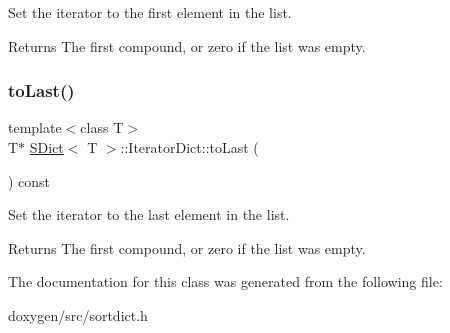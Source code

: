 Set the iterator to the first element in the list. \begin{DoxyReturn}{Returns}
The first compound, or zero if the list was empty. 
\end{DoxyReturn}
\mbox{\label{class_s_dict_1_1_iterator_dict_aae597075deb2c8fd6032b1145f9cefb0}} 
\subsubsection{\texorpdfstring{toLast()}{toLast()}}
{\footnotesize\ttfamily template$<$class T$>$ \\
T$\ast$ \mbox{\hyperlink{class_s_dict}{S\+Dict}}$<$ T $>$\+::Iterator\+Dict\+::to\+Last (\begin{DoxyParamCaption}{ }\end{DoxyParamCaption}) const\hspace{0.3cm}{\ttfamily [inline]}}

Set the iterator to the last element in the list. \begin{DoxyReturn}{Returns}
The first compound, or zero if the list was empty. 
\end{DoxyReturn}


The documentation for this class was generated from the following file\+:\begin{DoxyCompactItemize}
\item 
doxygen/src/sortdict.\+h\end{DoxyCompactItemize}
